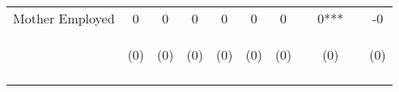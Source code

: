 \begin{tabular}{lcccccccccc}
\noalign{\smallskip}Mother Employed & 0 & 0 & 0 & 0 & 0 & 0 &  & 0*** &  & -0\\
 & \begin{footnotesize}(0)\end{footnotesize} & \begin{footnotesize}(0)\end{footnotesize} & \begin{footnotesize}(0)\end{footnotesize} & \begin{footnotesize}(0)\end{footnotesize} & \begin{footnotesize}(0)\end{footnotesize} & \begin{footnotesize}(0)\end{footnotesize} & \begin{footnotesize}\end{footnotesize} & \begin{footnotesize}(0)\end{footnotesize} & \begin{footnotesize}\end{footnotesize} & \begin{footnotesize}(0)\end{footnotesize}\\
\noalign{\smallskip}\hline\end{tabular}\\
